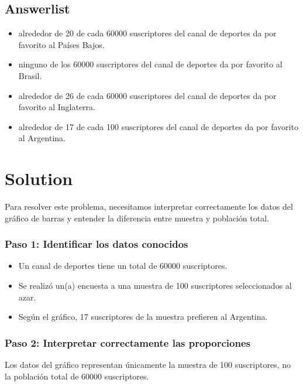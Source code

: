 \documentclass[
]{article}
\providecommand{\tightlist}{%
  \setlength{\itemsep}{0pt}\setlength{\parskip}{0pt}}
\begin{document}
\subsection{Answerlist}\label{answerlist}

\begin{itemize}
\tightlist
\item
  alrededor de 20 de cada 60000 suscriptores del canal de deportes da
  por favorito al Países Bajos.
\item
  ninguno de los 60000 suscriptores del canal de deportes da por
  favorito al Brasil.
\item
  alrededor de 26 de cada 60000 suscriptores del canal de deportes da
  por favorito al Inglaterra.
\item
  alrededor de 17 de cada 100 suscriptores del canal de deportes da por
  favorito al Argentina.
\end{itemize}

\section{Solution}\label{solution}

Para resolver este problema, necesitamos interpretar correctamente los
datos del gráfico de barras y entender la diferencia entre muestra y
población total.

\subsubsection{Paso 1: Identificar los datos
conocidos}\label{paso-1-identificar-los-datos-conocidos}

\begin{itemize}
\tightlist
\item
  Un canal de deportes tiene un total de 60000 suscriptores.
\item
  Se realizó un(a) encuesta a una muestra de 100 suscriptores
  seleccionados al azar.
\item
  Según el gráfico, 17 suscriptores de la muestra prefieren al
  Argentina.
\end{itemize}

\subsubsection{Paso 2: Interpretar correctamente las
proporciones}\label{paso-2-interpretar-correctamente-las-proporciones}

Los datos del gráfico representan únicamente la muestra de 100
suscriptores, no la población total de 60000 suscriptores.
\end{document}
